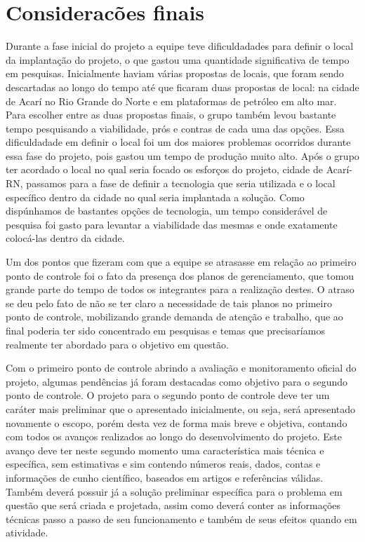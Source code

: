 \chapter[Considerações finais]{Consideracões finais}

Durante a fase inicial do projeto a equipe teve dificuldadades para definir o local da implantação do projeto, o que gastou uma quantidade significativa de tempo em pesquisas. Inicialmente haviam várias propostas de locais, que foram sendo descartadas ao longo do tempo até que ficaram duas propostas de local: na cidade de Acarí no Rio Grande do Norte e em plataformas de petróleo em alto mar. Para escolher entre as duas propostas finais, o grupo também levou bastante tempo pesquisando a viabilidade, prós e contras de cada uma das opções. Essa dificuldadade em definir o local foi um dos maiores problemas ocorridos durante essa fase do projeto, pois gastou um tempo de produção muito alto. Após o grupo ter acordado o local no qual seria focado os esforços do projeto, cidade de Acarí-RN, passamos para a fase de definir a tecnologia que seria utilizada e o local específico dentro da cidade no qual seria implantada a solução. Como dispúnhamos de bastantes opções de tecnologia, um tempo considerável de pesquisa foi gasto para levantar a viabilidade das mesmas e onde exatamente colocá-las dentro da cidade. 

Um dos pontos que fizeram com que a equipe se atrasasse em relação ao primeiro ponto de controle foi o fato da presença dos planos de gerenciamento,  que tomou grande parte do tempo de todos os integrantes para a realização destes. O atraso se deu pelo fato de não se ter claro a necessidade de tais planos no primeiro ponto de controle, mobilizando grande demanda de atenção e trabalho, que ao final poderia ter sido concentrado em pesquisas e temas que precisaríamos realmente ter abordado para o objetivo em questão.

Com o primeiro ponto de controle abrindo a avaliação e monitoramento oficial do projeto, algumas pendências já foram destacadas como objetivo para o segundo ponto de controle. O projeto para o segundo ponto de controle deve ter um caráter mais preliminar que o apresentado inicialmente, ou seja, será apresentado novamente o escopo, porém desta vez de forma mais breve e objetiva, contando com todos os avanços realizados ao longo do desenvolvimento do projeto. Este avanço deve ter neste segundo momento uma característica mais técnica e específica, sem estimativas e sim contendo números reais, dados, contas e informações de cunho científico, baseados em artigos e referências válidas. Também deverá possuir já a solução preliminar específica para o problema em questão que será criada e projetada, assim como deverá conter as informações técnicas passo a passo de seu funcionamento e também de seus efeitos quando em atividade.

